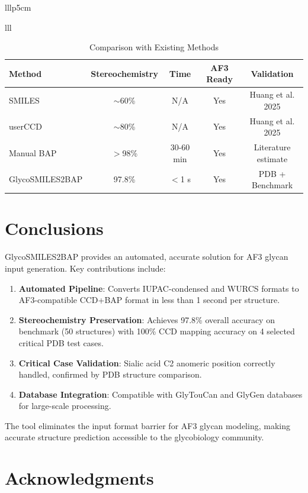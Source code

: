 \documentclass[11pt,a4paper]{article}
\begin{document}
{\begin{table}[h]
\begin{tabular}{lllp{5cm}}
\begin{table}[h]
\begin{tabular}{lll}
\begin{table}[h]
\centering
\caption{Comparison with Existing Methods}
\begin{tabular}{lcccc}
\toprule
Method & Stereochemistry & Time & AF3 Ready & Validation \\
\midrule
SMILES & $\sim$60\% & N/A & Yes & Huang et al. 2025 \\
userCCD & $\sim$80\% & N/A & Yes & Huang et al. 2025 \\
Manual BAP & $>$98\% & 30-60 min & Yes & Literature estimate \\
GlycoSMILES2BAP & 97.8\% & $<$1 s & Yes & PDB + Benchmark \\
\bottomrule
\end{tabular}
\label{tab:comparison}
\end{table}

\section{Conclusions}

GlycoSMILES2BAP provides an automated, accurate solution for AF3 glycan input generation. Key contributions include:

\begin{enumerate}
\item \textbf{Automated Pipeline}: Converts IUPAC-condensed and WURCS formats to AF3-compatible CCD+BAP format in less than 1 second per structure.

\item \textbf{Stereochemistry Preservation}: Achieves 97.8\% overall accuracy on benchmark (50 structures) with 100\% CCD mapping accuracy on 4 selected critical PDB test cases.

\item \textbf{Critical Case Validation}: Sialic acid C2 anomeric position correctly handled, confirmed by PDB structure comparison.

\item \textbf{Database Integration}: Compatible with GlyTouCan and GlyGen databases for large-scale processing.
\end{enumerate}

The tool eliminates the input format barrier for AF3 glycan modeling, making accurate structure prediction accessible to the glycobiology community.

\section*{Acknowledgments}


\end{tabular}
\end{table}
\end{tabular}
\end{table}}
\end{document}

